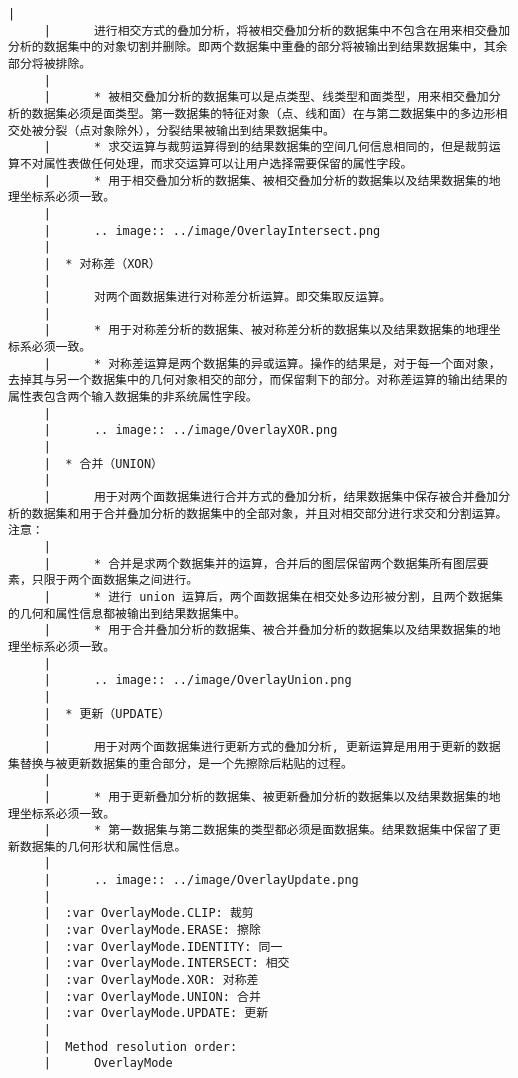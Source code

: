 \documentclass[11pt]{article}
\begin{document}
\begin{Verbatim}[commandchars=\\\{\}]
     |  
     |      进行相交方式的叠加分析，将被相交叠加分析的数据集中不包含在用来相交叠加分析的数据集中的对象切割并删除。即两个数据集中重叠的部分将被输出到结果数据集中，其余部分将被排除。
     |  
     |      * 被相交叠加分析的数据集可以是点类型、线类型和面类型，用来相交叠加分析的数据集必须是面类型。第一数据集的特征对象（点、线和面）在与第二数据集中的多边形相交处被分裂（点对象除外），分裂结果被输出到结果数据集中。
     |      * 求交运算与裁剪运算得到的结果数据集的空间几何信息相同的，但是裁剪运算不对属性表做任何处理，而求交运算可以让用户选择需要保留的属性字段。
     |      * 用于相交叠加分析的数据集、被相交叠加分析的数据集以及结果数据集的地理坐标系必须一致。
     |  
     |      .. image:: ../image/OverlayIntersect.png
     |  
     |  * 对称差（XOR）
     |  
     |      对两个面数据集进行对称差分析运算。即交集取反运算。
     |  
     |      * 用于对称差分析的数据集、被对称差分析的数据集以及结果数据集的地理坐标系必须一致。
     |      * 对称差运算是两个数据集的异或运算。操作的结果是，对于每一个面对象，去掉其与另一个数据集中的几何对象相交的部分，而保留剩下的部分。对称差运算的输出结果的属性表包含两个输入数据集的非系统属性字段。
     |  
     |      .. image:: ../image/OverlayXOR.png
     |  
     |  * 合并（UNION）
     |  
     |      用于对两个面数据集进行合并方式的叠加分析，结果数据集中保存被合并叠加分析的数据集和用于合并叠加分析的数据集中的全部对象，并且对相交部分进行求交和分割运算。 注意：
     |  
     |      * 合并是求两个数据集并的运算，合并后的图层保留两个数据集所有图层要素，只限于两个面数据集之间进行。
     |      * 进行 union 运算后，两个面数据集在相交处多边形被分割，且两个数据集的几何和属性信息都被输出到结果数据集中。
     |      * 用于合并叠加分析的数据集、被合并叠加分析的数据集以及结果数据集的地理坐标系必须一致。
     |  
     |      .. image:: ../image/OverlayUnion.png
     |  
     |  * 更新（UPDATE）
     |  
     |      用于对两个面数据集进行更新方式的叠加分析, 更新运算是用用于更新的数据集替换与被更新数据集的重合部分，是一个先擦除后粘贴的过程。
     |  
     |      * 用于更新叠加分析的数据集、被更新叠加分析的数据集以及结果数据集的地理坐标系必须一致。
     |      * 第一数据集与第二数据集的类型都必须是面数据集。结果数据集中保留了更新数据集的几何形状和属性信息。
     |  
     |      .. image:: ../image/OverlayUpdate.png
     |  
     |  :var OverlayMode.CLIP: 裁剪
     |  :var OverlayMode.ERASE: 擦除
     |  :var OverlayMode.IDENTITY: 同一
     |  :var OverlayMode.INTERSECT: 相交
     |  :var OverlayMode.XOR: 对称差
     |  :var OverlayMode.UNION: 合并
     |  :var OverlayMode.UPDATE: 更新
     |  
     |  Method resolution order:
     |      OverlayMode

\end{Verbatim}
\end{document}
